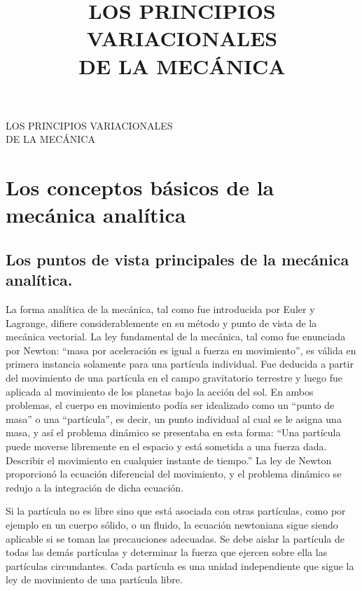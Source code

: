 \documentclass[12pt,a4paper]{book}
\title{\textbf{LOS PRINCIPIOS VARIACIONALES\\DE LA MEC\'ANICA}}
\author{}
\date{}
\begin{document}
\begin{titlepage}
\vspace*{\fill}
\begin{center}
{\Large LOS PRINCIPIOS VARIACIONALES\\[0.5cm] DE LA MEC\'ANICA}
\end{center}
\vspace*{\fill}
\end{titlepage}


\chapter{Los conceptos básicos de la mecánica analítica}

\section{Los puntos de vista principales de la mec\'anica anal\'itica.}

La forma anal\'itica de la mec\'anica, tal como fue introducida por Euler y Lagrange, difiere considerablemente en su m\'etodo y punto de vista de la mec\'anica vectorial. La ley fundamental de la mec\'anica, tal como fue enunciada por Newton: ``masa por aceleraci\'on es igual a fuerza en movimiento'', es v\'alida en primera instancia solamente para una part\'icula individual. Fue deducida a partir del movimiento de una part\'icula en el campo gravitatorio terrestre y luego fue aplicada al movimiento de los planetas bajo la acci\'on del sol. En ambos problemas, el cuerpo en movimiento pod\'ia ser idealizado como un ``punto de masa'' o una ``part\'icula'', es decir, un punto individual al cual se le asigna una masa, y as\'i el problema din\'amico se presentaba en esta forma: ``Una part\'icula puede moverse libremente en el espacio y est\'a sometida a una fuerza dada. Describir el movimiento en cualquier instante de tiempo.'' La ley de Newton proporcion\'o la ecuaci\'on diferencial del movimiento, y el problema din\'amico se redujo a la integraci\'on de dicha ecuaci\'on.

Si la part\'icula no es libre sino que est\'a asociada con otras part\'iculas, como por ejemplo en un cuerpo s\'olido, o un fluido, la ecuaci\'on newtoniana sigue siendo aplicable si se toman las precauciones adecuadas. Se debe aislar la part\'icula de todas las dem\'as part\'iculas y determinar la fuerza que ejercen sobre ella las part\'iculas circundantes. Cada part\'icula es una unidad independiente que sigue la ley de movimiento de una part\'icula libre.
\end{document}
